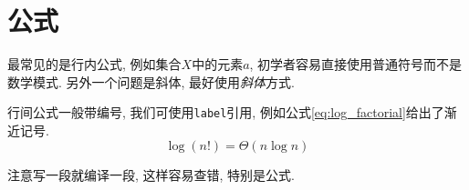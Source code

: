 \chapter{公式}

  最常见的是行内公式, 例如集合$X$中的元素$a$, 初学者容易直接使用普通符号而不是数学模式.
另外一个问题是斜体, 最好使用\emph{斜体}方式.

  行间公式一般带编号, 我们可使用\texttt{label}引用, 例如公式\ref{eq:log_factorial}给出了渐近记号.
\begin{equation}
\label{eq:log_factorial}
\log(n!) = \Theta(n\log{n})
\end{equation}

  注意写一段就编译一段, 这样容易查错, 特别是公式.
